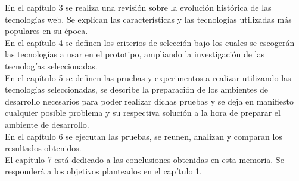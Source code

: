 En el capítulo 3 se realiza una revisión sobre la evolución histórica de las tecnologías web.
Se explican las características y las tecnologías utilizadas más populares en su época.\\

En el capítulo 4 se definen los criterios de selección bajo los cuales se escogerán las tecnologías a 
usar en el prototipo, ampliando la investigación de las tecnologías seleccionadas.\\

En el capítulo 5  se definen las pruebas y experimentos a realizar utilizando las tecnologías seleccionadas, 
se describe la preparación de los ambientes de desarrollo necesarios para poder realizar dichas pruebas y
se deja en manifiesto cualquier posible problema y su respectiva solución a la hora de preparar el
ambiente de desarrollo.\\

En el capítulo 6 se ejecutan las pruebas, se reunen, analizan y comparan los resultados obtenidos.\\

El capítulo 7  está dedicado a las conclusiones obtenidas en esta memoria. Se responderá a los
objetivos planteados en el capítulo 1.\\


\newpage